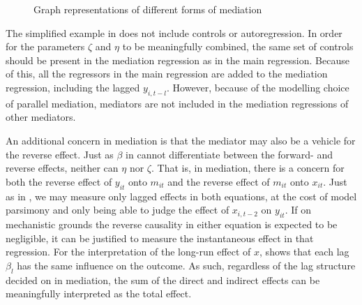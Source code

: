 \begin{figure}[htbp]
\begin{subfigure}[t]{0.32\textwidth}
        \label{fig:methods:mediation_forms:simultaneous}
    \end{subfigure}
    \caption{Graph representations of different forms of mediation}
    \label{fig:methods:mediation_forms}
\end{figure}

The simplified example in  does not include controls or autoregression. In order for the parameters $\zeta$ and $\eta$
to be meaningfully combined, the same set of controls should be present in the mediation regression as in the main
regression. Because of this, all the regressors in the main regression are added to the mediation regression, including
the lagged $y_{i,t-l}$. However, because of the modelling choice of parallel mediation, mediators are not included
in the mediation regressions of other mediators.

An additional concern in mediation is that the mediator may also be a vehicle for the reverse effect.
Just as $\beta$ in  cannot differentiate between the forward- and reverse effects,
neither can $\eta$ nor $\zeta$. That is, in mediation, there is a concern for both the reverse effect of $y_{it}$ onto
$m_{it}$ and the reverse effect of $m_{it}$ onto $x_{it}$. Just as in ,
we may measure only lagged effects in both equations, at the cost of model parsimony and only being able to judge the
effect of $x_{i,t-2}$ on $y_{it}$.
If on mechanistic grounds the reverse causality in either equation is expected to be negligible, it can be justified
to measure the instantaneous effect in that regression.
For the interpretation of the long-run effect of $x$,  shows that each lag $\beta_l$
has the same influence on the outcome. As such, regardless of the lag structure decided on in mediation, the sum of the
direct and indirect effects can be meaningfully interpreted as the total effect.

